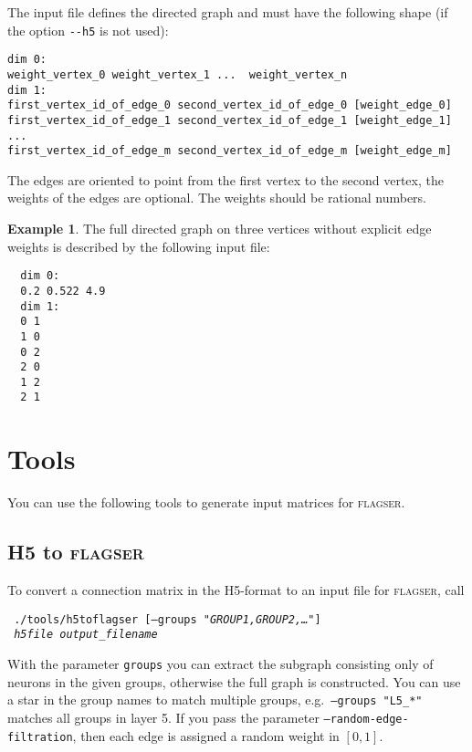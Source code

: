 \documentclass{amsart}
\theoremstyle{definition}
\newtheorem*{example*}{Example}
\begin{document}
\vspace{1em}

\noindent
The input file defines the directed graph and must have the following shape (if the option
\texttt{-{}-h5} is not used):

\vspace{.5em}
\begin{verbatim}
dim 0:
weight_vertex_0 weight_vertex_1 ...  weight_vertex_n
dim 1:
first_vertex_id_of_edge_0 second_vertex_id_of_edge_0 [weight_edge_0]
first_vertex_id_of_edge_1 second_vertex_id_of_edge_1 [weight_edge_1]
...
first_vertex_id_of_edge_m second_vertex_id_of_edge_m [weight_edge_m]
\end{verbatim}
\vspace{.5em}

\noindent
The edges are oriented to point from the first vertex to the second vertex, the weights of the edges
are optional.
The weights should be rational numbers.

\begin{example*}
  The full directed graph on three vertices without explicit edge weights is described by the
  following input file:

  \vspace{.5em}
  \begin{verbatim}
  dim 0:
  0.2 0.522 4.9
  dim 1:
  0 1
  1 0
  0 2
  2 0
  1 2
  2 1
  \end{verbatim}
\end{example*}

\section{Tools}
You can use the following tools to generate input matrices for \textsc{flagser}.

\subsection{H5 to \textsc{flagser}}
To convert a connection matrix in the H5-format to an input file for \textsc{flagser}, call

\noindent
\verb| |\texttt{\qquad./tools/h5toflagser [--groups \textit{"GROUP1,GROUP2,\dots"}]} \\
\verb| |\texttt{\qquad{} \textit{h5file} \textit{output\_filename}}

With the parameter \texttt{groups} you can extract the subgraph consisting only of neurons in the
given groups, otherwise the full graph is constructed. You can use a star in the group names to
match multiple groups, e.g.\ \texttt{--groups "L5\_*"} matches all groups in layer 5.
If you pass the parameter \texttt{--random-edge-filtration}, then each edge is assigned a random
weight in $[0,1]$.
\end{document}
